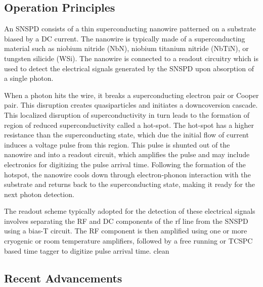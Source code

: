 \documentclass[11pt]{caltech_thesis} %
\begin{document}
\hypertarget{operation-principles}{%
\subsection{Operation Principles}\label{operation-principles}}

An SNSPD consists of a thin superconducting nanowire patterned on a substrate biased by a DC current. The nanowire is typically made of a superconducting material such as niobium nitride (NbN), niobium titanium nitride (NbTiN), or tungsten silicide (WSi). The nanowire is connected to a readout circuitry which is used to detect the electrical signals generated by the SNSPD upon absorption of a single photon.

When a photon hits the wire, it breaks a superconducting electron pair or Cooper pair. This disruption creates quasiparticles and initiates a downcoversion cascade. This localized disruption of superconductivity in turn leads to the formation of region of reduced superconductivity called a hot-spot. The hot-spot has a higher resistance than the superconducting state, which due the initial flow of current induces a voltage pulse from this region. This pulse is shunted out of the nanowire and into a readout circuit, which amplifies the pulse and may include electronics for digitizing the pulse arrival time. Following the formation of the hotspot, the nanowire cools down through electron-phonon interaction with the substrate and returns back to the superconducting state, making it ready for the next photon detection.

The readout scheme typically adopted for the detection of these electrical signals involves separating the RF and DC components of the rf line from the SNSPD using a bias-T circuit. The RF component is then amplified using one or more cryogenic or room temperature amplifiers, followed by a free running or TCSPC based time tagger to digitize pulse arrival time.
clean

\hypertarget{recent-advancements}{%
\subsection{Recent Advancements}\label{recent-advancements}}
\end{document}
